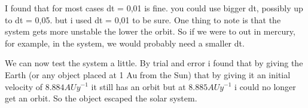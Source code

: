 \documentclass[norsk,a4paper,12pt]{article}
\begin{document}
\begin{figure}[H]
  \begin{center}
  \end{center}
 \caption{\textit{ }}
  \label{fig:edge}
\end{figure}

I found that for most cases dt = 0,01 is fine. you could use bigger dt, possibly  up to dt = 0,05. but i used dt = 0,01 to be sure.
One thing to note is that the system gets more unstable the lower the orbit. So if we were to out in mercury, for example, in the 
system, we would probably need a smaller dt.

We can now test the system a little. By trial and error i found that by giving the Earth (or any object placed at 1 Au from the Sun)
that by giving it an initial velocity of $8.884 AUy^{-1}$ it still has an orbit but at $8.885 AUy^{-1}$ i could no longer get an 
orbit. So the object escaped the solar system.
\end{document}
